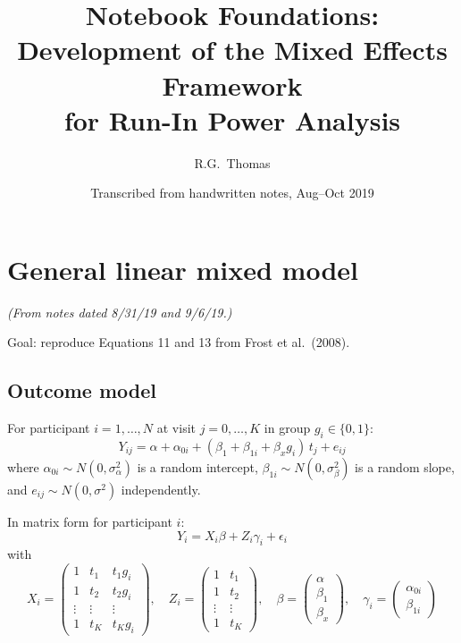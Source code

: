 \documentclass[11pt]{article}
\title{Notebook Foundations:\\
  Development of the Mixed Effects Framework\\
  for Run-In Power Analysis}
\author{R.G.\ Thomas}
\date{Transcribed from handwritten notes, Aug--Oct 2019}
\begin{document}
\maketitle
\tableofcontents


\section{General linear mixed model}
\label{sec:lmm}

\noindent
\textit{(From notes dated 8/31/19 and 9/6/19.)}

\medskip
\noindent
Goal: reproduce Equations 11 and 13 from Frost et al.\ (2008).

\subsection{Outcome model}

For participant $i = 1, \ldots, N$ at visit $j = 0, \ldots, K$
in group $g_i \in \{0, 1\}$:
\begin{equation}
  Y_{ij} = \alpha + \alpha_{0i} + (\beta_1 + \beta_{1i}
    + \beta_x g_i)\, t_j + e_{ij}
\end{equation}
where $\alpha_{0i} \sim N(0, \sigma_\alpha^2)$ is a random
intercept, $\beta_{1i} \sim N(0, \sigma_\beta^2)$ is a random
slope, and $e_{ij} \sim N(0, \sigma^2)$ independently.

In matrix form for participant $i$:
\begin{equation}
  Y_i = X_i \beta + Z_i \gamma_i + \epsilon_i
  \label{eq:lmm}
\end{equation}
with
\begin{equation}
  X_i = \begin{pmatrix}
    1 & t_1 & t_1 g_i \\
    1 & t_2 & t_2 g_i \\
    \vdots & \vdots & \vdots \\
    1 & t_K & t_K g_i
  \end{pmatrix}, \quad
  Z_i = \begin{pmatrix}
    1 & t_1 \\
    1 & t_2 \\
    \vdots & \vdots \\
    1 & t_K
  \end{pmatrix}, \quad
  \beta = \begin{pmatrix}
    \alpha \\ \beta_1 \\ \beta_x
  \end{pmatrix}, \quad
  \gamma_i = \begin{pmatrix}
    \alpha_{0i} \\ \beta_{1i}
  \end{pmatrix}
\end{equation}
\end{document}
